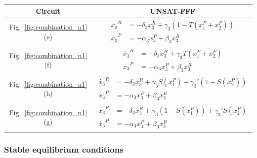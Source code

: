 {
\setlength{\tabcolsep}{10pt}
\renewcommand{\arraystretch}{3.0}
\begin{table}[H]
    \centering
    \vspace{0.2cm}
    \hspace*{-1.5cm}
    \begin{tabular}{|c|c|}
        \hline
        \textbf{Circuit} & \textbf{UNSAT-FFF} \\
        \hline
        Fig.~\ref{fig:combination_n1}(e) & 
        $\begin{aligned}
            \dot{x_3}^R &= -\delta_3 x_3^R + \gamma_3(1-T(x_1^P+x_2^P))\\
            \dot{x_3}^P &= -\alpha_3 x_3^P + \beta_3 x_3^R
        \end{aligned}$ \\[0.25cm]
        \hline
        Fig.~\ref{fig:combination_n1}(f)  &
        $\begin{aligned}
            \dot{x_3}^R &= -\delta_3 x_3^R + \gamma_3T(x_1^P+x_2^P)\\
            \dot{x_3}^P &= -\alpha_3 x_3^P + \beta_3 x_3^R
        \end{aligned}$ \\[0.25cm]
        \hline
        Fig.~\ref{fig:combination_n1}(h)
        & $\begin{aligned}
            \dot{x_3}^R &= -\delta_3 x_3^R + \gamma_3 S(x_1^P) + \gamma_3'(1 - S(x_2^P))\\
            \dot{x_3}^P &= -\alpha_3 x_3^P + \beta_3 x_3^R
        \end{aligned}$ \\[0.25cm]
        \hline
        Fig.~\ref{fig:combination_n1}(g)
        & $\begin{aligned}
            \dot{x_3}^R &= -\delta_3 x_3^R + \gamma_3(1 - S(x_1^P)) + \gamma_3' S(x_2^P) \\
            \dot{x_3}^P &= -\alpha_3 x_3^P + \beta_3 x_3^R
        \end{aligned}$ \\[0.25cm]
        \hline
    \end{tabular}
\end{table}
}

\subsubsection{Stable equilibrium conditions}


